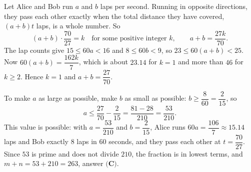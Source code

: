 Let Alice and Bob run $a$ and $b$ laps per second. Running in opposite directions, they pass each other exactly when the total distance they have covered, $(a+b)t$ laps, is a whole number. So
\[(a+b)\cdot\dfrac{70}{27}=k\quad\text{for some positive integer }k,\qquad a+b=\dfrac{27k}{70}.\]
The lap counts give $15\le60a<16$ and $8\le60b<9$, so $23\le60(a+b)<25$. Now $60(a+b)=\dfrac{162k}{7}$, which is about $23.14$ for $k=1$ and more than $46$ for $k\ge2$. Hence $k=1$ and $a+b=\dfrac{27}{70}$.

To make $a$ as large as possible, make $b$ as small as possible: $b\ge\dfrac{8}{60}=\dfrac{2}{15}$, so
\[a\le\dfrac{27}{70}-\dfrac{2}{15}=\dfrac{81-28}{210}=\dfrac{53}{210}.\]
This value is possible: with $a=\dfrac{53}{210}$ and $b=\dfrac{2}{15}$, Alice runs $60a=\dfrac{106}{7}\approx15.14$ laps and Bob exactly $8$ laps in $60$ seconds, and they pass each other at $t=\dfrac{70}{27}$. Since $53$ is prime and does not divide $210$, the fraction is in lowest terms, and $m+n=53+210=\boxed{263}$, answer $\textbf{(C)}$.
